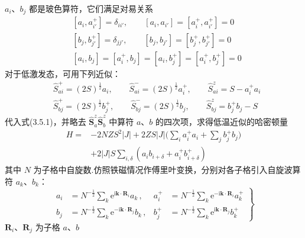 $a_i$、$b_j$ 都是玻色算符，它们满足对易关系
\begin{equation}
\begin{aligned}
  &\left[a_i,a_{i'}^{+}\right]=\delta_{ii'},\qquad
  \left[a_i,a_{i'}\right]=\left[a_i^{+},a_{i'}^{+}\right]=0\\
  &\left[b_j,b_{j'}^{+}\right]=\delta_{jj'},\qquad
  \left[b_j,b_{j'}\right]=\left[b_j^{+},b_{j'}^{+}\right]=0\\
  &\left[a_i,b_j\right]=\left[a_i^{+},b_j\right]=\left[a_i,b_j^{+}\right]=\left[a_i^{+},b_j^{+}\right]=0
\end{aligned}
\end{equation}
对于低激发态，可用下列近似：
\begin{equation}
\begin{aligned}
  &\hat{S}_{ai}^{+}=(2S)^{\frac{1}{2}}a_i,\qquad
  \hat{S}_{ai}^{-}=(2S)^{\frac{1}{2}}a_i^{+},\qquad
  \hat{S}_{ai}^{z}=S-a_i^{+}a_i\\
  &\hat{S}_{bj}^{+}=(2S)^{\frac{1}{2}}b_j^{+},\qquad
  \hat{S}_{bj}^{-}=(2S)^{\frac{1}{2}}b_j,\qquad
  \hat{S}_{bj}^{z}=b_j^{+}b_j-S
\end{aligned}
\end{equation}
代入式(3.5.1)，并略去 $\hat{\boldsymbol{S}}_a^{z}\hat{\boldsymbol{S}}_b^{z}$
中算符 $a$、$b$ 的四次项，求得低温近似的哈密顿量
\begin{equation}
\begin{aligned}
  H={}&-2NZS^2\left|J\right|+2ZS\left|J\right|\biggl(\sum_i a_i^{+}a_i+\sum_j b_j^{+}b_j\biggr)\\
  &+2\left|J\right|S\sum_{i,\delta}\left(a_ib_{i+\delta}+a_i^{+}b_{i+\delta}^{+}\right)
\end{aligned}
\end{equation}
其中 $N$ 为子格中自旋数.仿照铁磁情况作傅里叶变换，分别对各子格引入自旋波算符 $a_k$、$b_k$：
\begin{equation}
  \left.\begin{aligned}
    a_i&=N^{-\frac{1}{2}}\sum_k\mathrm{e}^{\mathrm{i}\boldsymbol{k}\cdot\boldsymbol{R}_i}a_k\,,&
    a_i^{+}&=N^{-\frac{1}{2}}\sum_k\mathrm{e}^{-\mathrm{i}\boldsymbol{k}\cdot\boldsymbol{R}_i}a_k^{+}\\
    b_j&=N^{-\frac{1}{2}}\sum_k\mathrm{e}^{-\mathrm{i}\boldsymbol{k}\cdot\boldsymbol{R}_j}b_k\,,&
    b_j^{+}&=N^{-\frac{1}{2}}\sum_k\mathrm{e}^{\mathrm{i}\boldsymbol{k}\cdot\boldsymbol{R}_j}b_k^{+}
  \end{aligned}\right\}
\end{equation}
$\boldsymbol{R}_i$、$\boldsymbol{R}_j$ 为子格 $a$、$b$
